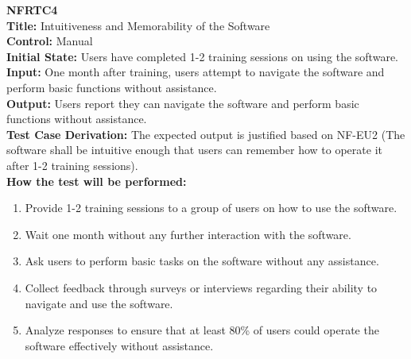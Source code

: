 \documentclass[12pt, titlepage]{article}
\begin{document}
\textbf{NFRTC4}\\
\textbf{Title:} Intuitiveness and Memorability of the Software\\
\textbf{Control:} Manual\\
\textbf{Initial State:} Users have completed 1-2 training sessions on using the software.\\
\textbf{Input:} One month after training, users attempt to navigate the software and perform basic functions without assistance.\\
\textbf{Output:} Users report they can navigate the software and perform basic functions without assistance.\\
\textbf{Test Case Derivation:} The expected output is justified based on NF-EU2 (The software shall be intuitive enough that users can remember how to operate it after 1-2 training sessions).\\
\textbf{How the test will be performed:}
\begin{enumerate}
  \item Provide 1-2 training sessions to a group of users on how to use the software.
  \item Wait one month without any further interaction with the software.
  \item Ask users to perform basic tasks on the software without any assistance.
  \item Collect feedback through surveys or interviews regarding their ability to navigate and use the software.
  \item Analyze responses to ensure that at least 80\% of users could operate the software effectively without assistance.
\end{enumerate}
\vspace{1em}
\end{document}

